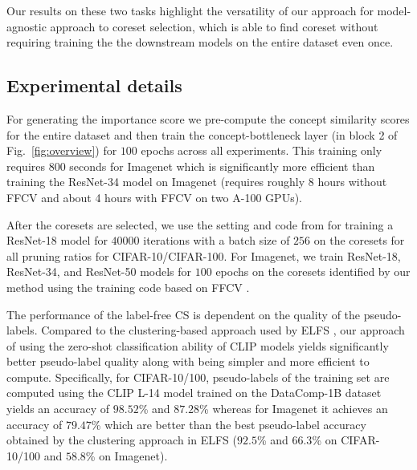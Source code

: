 Our results on these two tasks highlight the versatility of our approach for model-agnostic approach to coreset selection, which is able to find coreset without requiring training the the downstream models on the entire dataset even once.


\subsection{Experimental details}
For generating the importance score we pre-compute the concept similarity scores for the entire dataset and then train the concept-bottleneck layer (in block 2 of Fig.~\ref{fig:overview}) for $100$ epochs across all experiments. 
This training only requires 800 seconds for Imagenet which is significantly more efficient than training the ResNet-34 model on Imagenet (requires roughly 8 hours without FFCV and about 4 hours with FFCV on two A-100 GPUs).

After the coresets are selected, we use the setting and code from \cite{zheng2022coverage} for training a ResNet-18 model for $40000$ iterations with a batch size of $256$ on the coresets for all pruning ratios for CIFAR-10/CIFAR-100.
For Imagenet, we train ResNet-18, ResNet-34, and ResNet-50 models for $100$ epochs on the coresets identified by our method using the training code based on FFCV \cite{leclerc2023ffcv}.

The performance of the label-free CS is dependent on the quality of the pseudo-labels. 
Compared to the clustering-based approach used by ELFS \cite{zheng2024elfs}, our approach of using the zero-shot classification ability of CLIP models yields significantly better pseudo-label quality along with being simpler and more efficient to compute. 
Specifically, for CIFAR-10/100, pseudo-labels of the training set are computed using the CLIP L-14 model trained on the DataComp-1B dataset \cite{ilharco_gabriel_2021_5143773} yields an accuracy of $98.52$\% and $87.28$\% whereas for Imagenet it achieves an accuracy of $79.47$\%
which are better than the best pseudo-label accuracy obtained by the clustering approach in ELFS ($92.5$\% and $66.3$\% on CIFAR-10/100 and $58.8$\% on Imagenet).

